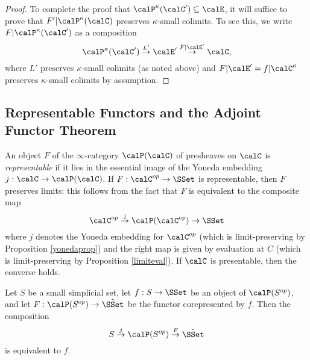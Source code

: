 \begin{proof}
To complete the proof that $\calP^{\kappa}(\calC') \subseteq \calE$, it will suffice to prove that
$F' | \calP^{\kappa}(\calC)$ preserves $\kappa$-small colimits. 
To see this, we write
$F| \calP^{\kappa}(\calC')$ as a composition
$$ \calP^{\kappa}(\calC') \stackrel{L'}{\rightarrow} \calE' \stackrel{F|\calE'}{\rightarrow} \calC,$$
where $L'$ preserves $\kappa$-small colimits (as noted above) and $F|\calE' = f|\calC^{\kappa}$ preserves $\kappa$-small colimits by assumption. 
\end{proof}

\subsection{Representable Functors and the Adjoint Functor Theorem}\label{aftt}

An object $F$ of the $\infty$-category $\calP(\calC)$ of presheaves on $\calC$ is
{\it representable} if it lies in the essential image of the Yoneda embedding $j: \calC \rightarrow \calP(\calC)$. If $F: \calC^{op} \rightarrow \SSet$ is representable, then $F$ preserves limits:
this follows from the fact that $F$ is equivalent to the composite map
$$ \calC^{op} \stackrel{j}{\rightarrow} \calP( \calC^{op} ) \rightarrow \SSet $$
where $j$ denotes the Yoneda embedding for $\calC^{op}$ (which is limit-preserving by Proposition \ref{yonedaprop}) and the right map is given by evaluation at $C$ (which is 
limit-preserving by Proposition \ref{limiteval}). If $\calC$ is presentable, then the converse holds.

\begin{lemma}\label{stewgood}
Let $S$ be a small simplicial set, let $f: S \rightarrow \SSet$ be an object
of $\calP(S^{op})$, and let $F: \calP(S^{op}) \rightarrow \hat{\SSet}$ be the functor corepresented by $f$. Then the composition
$$ S \stackrel{j}{\rightarrow} \calP(S^{op}) \stackrel{F}{\rightarrow} \hat{\SSet}$$
is equivalent to $f$.
\end{lemma}


